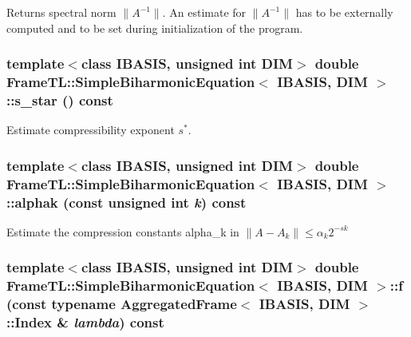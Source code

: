 Returns spectral norm $\|A^{-1}\|$. An estimate for $\|A^{-1}\|$ has to be externally computed and to be set during initialization of the program. \hypertarget{classFrameTL_1_1SimpleBiharmonicEquation_1948f60a5da7ba5f9d1737817741ca6a}{
\subsubsection[s\_\-star]{\setlength{\rightskip}{0pt plus 5cm}template$<$class IBASIS, unsigned int DIM$>$ double {\bf FrameTL::SimpleBiharmonicEquation}$<$ IBASIS, DIM $>$::s\_\-star () const}}
\label{classFrameTL_1_1SimpleBiharmonicEquation_1948f60a5da7ba5f9d1737817741ca6a}


Estimate compressibility exponent $s^\ast$. \hypertarget{classFrameTL_1_1SimpleBiharmonicEquation_d7aedcf83a6ee9d35ec8086eb9d7a528}{
\subsubsection[alphak]{\setlength{\rightskip}{0pt plus 5cm}template$<$class IBASIS, unsigned int DIM$>$ double {\bf FrameTL::SimpleBiharmonicEquation}$<$ IBASIS, DIM $>$::alphak (const unsigned int {\em k}) const}}
\label{classFrameTL_1_1SimpleBiharmonicEquation_d7aedcf83a6ee9d35ec8086eb9d7a528}


Estimate the compression constants alpha\_\-k in $\|A-A_k\| \leq \alpha_k 2^{-sk}$ \hypertarget{classFrameTL_1_1SimpleBiharmonicEquation_cea8f8210b9b4717080f54b9aafa7e28}{
\subsubsection[f]{\setlength{\rightskip}{0pt plus 5cm}template$<$class IBASIS, unsigned int DIM$>$ double {\bf FrameTL::SimpleBiharmonicEquation}$<$ IBASIS, DIM $>$::f (const typename {\bf AggregatedFrame}$<$ IBASIS, DIM $>$::{\bf Index} \& {\em lambda}) const}}
\label{classFrameTL_1_1SimpleBiharmonicEquation_cea8f8210b9b4717080f54b9aafa7e28}


